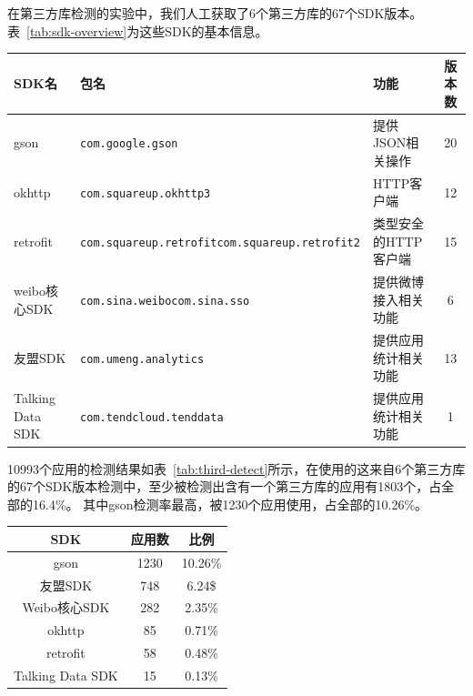 在第三方库检测的实验中，我们人工获取了6个第三方库的67个SDK版本。
表~\ref{tab:sdk-overview}为这些SDK的基本信息。

\begin{table}
	\centering
	\begin{tabularx}{\textwidth}{|X|X|X|c|}
		\hline
		SDK名 & 包名 & 功能 & 版本数\\
		\hline
		gson & \texttt{com.google.gson} & 提供JSON相关操作 & 20\\
		\hline
		okhttp & \texttt{com.squareup.okhttp3} & HTTP客户端 & 12\\
		\hline
		retrofit & \texttt{com.squareup.retrofit}\newline\texttt{com.squareup.retrofit2} & 类型安全的HTTP客户端 & 15\\
		\hline
		weibo核心SDK & \texttt{com.sina.weibo}\newline\texttt{com.sina.sso} & 提供微博接入相关功能 & 6\\
		\hline
		友盟SDK & \texttt{com.umeng.analytics} & 提供应用统计相关功能 & 13\\
		\hline
		Talking Data SDK & \texttt{com.tendcloud.tenddata} & 提供应用统计相关功能 & 1\\
		\hline
	\end{tabularx}
\end{table}

10993个应用的检测结果如表~\ref{tab:third-detect}所示，在使用的这来自6个第三方库的67个SDK版本检测中，至少被检测出含有一个第三方库的应用有1803个，占全部的16.4\%。
其中gson检测率最高，被1230个应用使用，占全部的10.26\%。

\begin{table}
	\centering
	\begin{tabular}{|c|c|c|}
		\hline
		SDK & 应用数 & 比例\\
		\hline
		gson & 1230 & 10.26\%\\
		\hline
		友盟SDK & 748 & 6.24\$\\
		\hline
		Weibo核心SDK & 282 & 2.35\%\\
		\hline
		okhttp & 85 & 0.71\%\\
		\hline
		retrofit & 58 & 0.48\%\\
		\hline
		Talking Data SDK & 15 & 0.13\%\\
		\hline
	\end{tabular}
\end{table}


